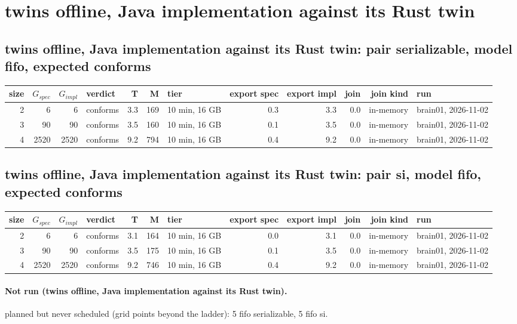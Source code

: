 \documentclass[10pt]{article}
\begin{document}
\section*{twins offline, Java implementation against its Rust twin}
\subsection*{twins offline, Java implementation against its Rust twin: pair \textsf{serializable}, model fifo, expected conforms}
\begin{longtable}{@{}rrrlrrlrrrrl@{}}
\toprule
size & $G_{\mathit{spec}}$ & $G_{\mathit{impl}}$ & verdict & T & M & tier & export spec & export impl & join & join kind & run \\
\midrule
\endhead
\color{red} 2 & 6 & 6 & conforms & 3.3 & 169 & 10 min, 16 GB & 0.3 & 3.3 & 0.0 & in-memory & brain01, 2026-11-02 \\
\color{red} 3 & 90 & 90 & conforms & 3.5 & 160 & 10 min, 16 GB & 0.1 & 3.5 & 0.0 & in-memory & brain01, 2026-11-02 \\
\color{red} 4 & 2520 & 2520 & conforms & 9.2 & 794 & 10 min, 16 GB & 0.4 & 9.2 & 0.0 & in-memory & brain01, 2026-11-02 \\
\bottomrule
\end{longtable}
\subsection*{twins offline, Java implementation against its Rust twin: pair \textsf{si}, model fifo, expected conforms}
\begin{longtable}{@{}rrrlrrlrrrrl@{}}
\toprule
size & $G_{\mathit{spec}}$ & $G_{\mathit{impl}}$ & verdict & T & M & tier & export spec & export impl & join & join kind & run \\
\midrule
\endhead
\color{red} 2 & 6 & 6 & conforms & 3.1 & 164 & 10 min, 16 GB & 0.0 & 3.1 & 0.0 & in-memory & brain01, 2026-11-02 \\
\color{red} 3 & 90 & 90 & conforms & 3.5 & 175 & 10 min, 16 GB & 0.1 & 3.5 & 0.0 & in-memory & brain01, 2026-11-02 \\
\color{red} 4 & 2520 & 2520 & conforms & 9.2 & 746 & 10 min, 16 GB & 0.4 & 9.2 & 0.0 & in-memory & brain01, 2026-11-02 \\
\bottomrule
\end{longtable}
\paragraph{Not run (twins offline, Java implementation against its Rust twin).}
planned but never scheduled (grid points beyond the ladder): 5 fifo serializable, 5 fifo si.\par
\end{document}
